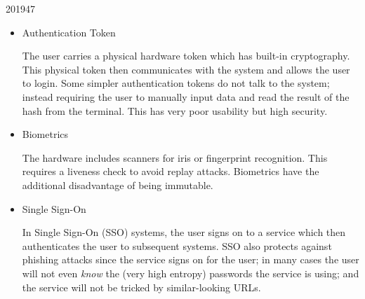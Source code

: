 \documentclass[10pt,\jkfside,a4paper]{article}
\begin{document}
\begin{examquestion}{2019}{4}{7}
\begin{enumerate}[label=(\alph*)]
\begin{itemize}

\item Authentication Token

The user carries a physical hardware token which has built-in cryptography.
This physical token then communicates with the system and allows the user to
login. Some simpler authentication tokens do not talk to the system; instead
requiring the user to manually input data and read the result of the hash
from the terminal. This has very poor usability but high security.

\item Biometrics

The hardware includes scanners for iris or fingerprint recognition. This
requires a liveness check to avoid replay attacks. Biometrics have the
additional disadvantage of being immutable.

\item Single Sign-On

In Single Sign-On (SSO) systems, the user signs on to a service which then
authenticates the user to subsequent systems. SSO also protects against
phishing attacks since the service signs on for the user; in many cases the
user will not even \textit{know} the (very high entropy) passwords the service
is using; and the service will not be tricked by similar-looking URLs.

\end{itemize}

\end{enumerate}

\end{examquestion}
\end{document}
